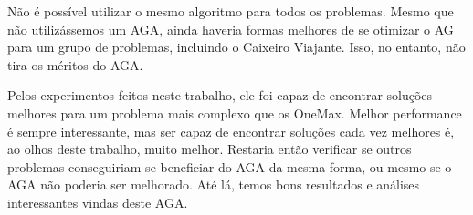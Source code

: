 Não é possível utilizar o mesmo algoritmo para todos os problemas. Mesmo que não utilizássemos um AGA, ainda haveria formas melhores de se otimizar o AG para um grupo de problemas, incluindo o Caixeiro Viajante. Isso, no entanto, não tira os méritos do AGA.

Pelos experimentos feitos neste trabalho, ele foi capaz de encontrar soluções melhores para um problema mais complexo que os OneMax. Melhor performance é sempre interessante, mas ser capaz de encontrar soluções cada vez melhores é, ao olhos deste trabalho, muito melhor. Restaria então verificar se outros problemas conseguiriam se beneficiar do AGA da mesma forma, ou mesmo se o AGA não poderia ser melhorado. Até lá, temos bons resultados e análises interessantes vindas deste AGA.
